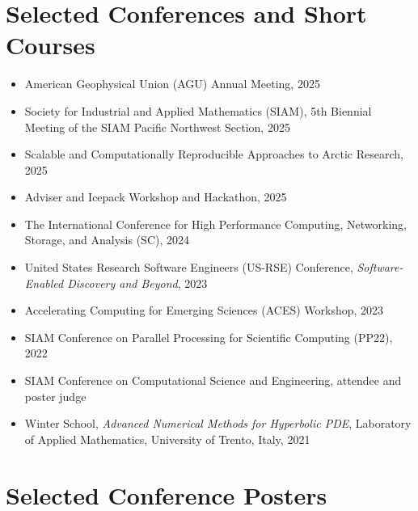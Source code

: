 \documentclass[11pt]{article}
\begin{document}
\section*{Selected Conferences and Short Courses}

\begin{itemize}[leftmargin=1.2em, itemsep=2pt, topsep=2pt]

\item American Geophysical Union (AGU) Annual Meeting, 2025

\item Society for Industrial and Applied Mathematics (SIAM), 5th Biennial Meeting of the SIAM Pacific Northwest Section, 2025

\item Scalable and Computationally Reproducible Approaches to Arctic Research, 2025

\item Adviser and Icepack Workshop and Hackathon, 2025

\item The International Conference for High Performance Computing, Networking, Storage, and Analysis (SC), 2024

\item United States Research Software Engineers (US-RSE) Conference, \textit{Software-Enabled Discovery and Beyond}, 2023

\item Accelerating Computing for Emerging Sciences (ACES) Workshop, 2023

\item SIAM Conference on Parallel Processing for Scientific Computing (PP22), 2022

\item SIAM Conference on Computational Science and Engineering, attendee and poster judge

\item Winter School, \textit{Advanced Numerical Methods for Hyperbolic PDE}, Laboratory of Applied Mathematics, University of Trento, Italy, 2021

\end{itemize}

\section*{Selected Conference Posters}
\end{document}
